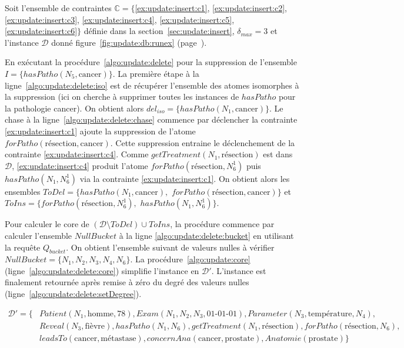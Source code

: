 \begin{example}
    Soit l'ensemble de contraintes $\mathbb{C} = \{$\ref{ex:update:insert:c1}, \ref{ex:update:insert:c2}, \ref{ex:update:insert:c3}, \ref{ex:update:insert:c4}, \ref{ex:update:insert:c5}, \ref{ex:update:insert:c6}$\}$ définie dans la section~\ref{sec:update:insert}, $\delta_{max} = 3$ et l'instance $\mathcal{D}$ donné figure~\ref{fig:update:db:runex} (page~\pageref{fig:update:db:runex}).

    En exécutant la procédure~\ref{algo:update:delete} pour la suppression de l'ensemble $I = \{ hasPatho(N_5, \text{cancer}) \}$.
    La première étape à la ligne~\ref{algo:update:delete:iso} est de récupérer l'ensemble des atomes isomorphes à la suppression (ici on cherche à supprimer toutes les instances de $hasPatho$ pour la pathologie cancer).
    On obtient alors $del_{iso} = \{ hasPatho(N_1, \text{cancer}) \}$.
    Le \gls{chase} à la ligne~\ref{algo:update:delete:chase} commence par déclencher la contrainte \ref{ex:update:insert:c1} ajoute la suppression de l'atome $forPatho(\text{résection}, \text{cancer})$.
    Cette suppression entraine le déclenchement de la contrainte \ref{ex:update:insert:c4}.
    Comme $getTreatment(N_1, \text{résection})$ est dans $\mathcal{D}$, \ref{ex:update:insert:c4} produit l'atome $forPatho(\text{résection}, N_6^1)$ puis $hasPatho(N_1, N_6^1)$ via la contrainte \ref{ex:update:insert:c1}.
    On obtient alors les ensembles $ToDel = \{ hasPatho(N_1, \text{cancer}),$ $forPatho(\text{résection}, \text{cancer})\}$ et $ToIns = \{ forPatho(\text{résection}, N_6^1),$ $hasPatho(N_1, N_6^1) \}$.

    Pour calculer le \gls{core} de $(\mathcal{D} \setminus ToDel) \cup ToIns$, la procédure commence par calculer l'ensemble $NullBucket$ à la ligne \ref{algo:update:delete:bucket} en utilisant la requête $Q_{bucket}$.
    On obtient l'ensemble suivant de valeurs nulles à vérifier $NullBucket = \{N_1, N_2, N_3, N_4, N_6\}$.
    La procédure~\ref{algo:update:core} (ligne~\ref{algo:update:delete:core}) simplifie l'instance en $\mathcal{D}'$.
    L'instance est finalement retournée après remise à zéro du degré des valeurs nulles (ligne~\ref{algo:update:delete:setDegree}).

    \begin{align*}
        \mathcal{D'} = \{ & Patient(N_1, \text{homme}, 78), Exam(N_1, N_2, N_3, \text{01-01-01}), Parameter(N_3, \text{température}, N_4),        \\
                          & Reveal(N_3, \text{fièvre}), hasPatho(N_1, N_6), getTreatment(N_1, \text{résection}), forPatho(\text{résection}, N_6), \\
                          & leadsTo(\text{cancer}, \text{métastase}), concernAna(\text{cancer}, \text{prostate}), Anatomie(\text{prostate}) \}
    \end{align*}
\end{example}
